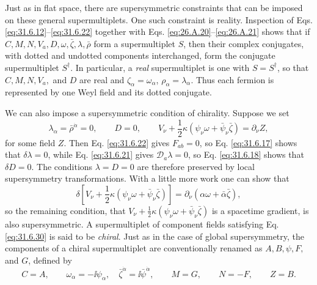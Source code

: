 Just as in flat space, there are supersymmetric constraints that can be
imposed on these general supermultiplets. One such constraint is
reality. Inspection of Eqs. \eqref{eq:31.6.12}--\eqref{eq:31.6.22}
together with Eqs. \eqref{eq:26.A.20}--\eqref{eq:26.A.21} shows that if
\(C,M,N,V_a,D,\omega,\bar\zeta,\lambda,\bar\rho\) form a supermultiplet
\(S\), then their complex conjugates, with dotted and undotted components
interchanged, form the conjugate supermultiplet \(S^\dagger\). In
particular, a \emph{real} supermultiplet is one with \(S=S^\dagger\), so
that \(C,M,N,V_a,\) and \(D\) are real and
\(\zeta_\alpha=\omega_\alpha\), \(\rho_\alpha=\lambda_\alpha\). Thus each
fermion is represented by one Weyl field and its dotted conjugate.

We can also impose a supersymmetric condition of chirality. Suppose we
set
\begin{equation}
  \lambda_\alpha=\bar\rho^{\dot\alpha}=0,\qquad D=0,\qquad
  V_\nu+\frac{1}{2}\kappa
   (\psi_\nu\omega+\bar\psi_\nu\bar\zeta)=\partial_\nu Z,
  \tag{31.6.30}\label{eq:31.6.30}
\end{equation}
for some field \(Z\). Then Eq. \eqref{eq:31.6.22} gives \(F_{ab}=0\), so
Eq. \eqref{eq:31.6.17} shows that \(\delta\lambda=0\), while
Eq. \eqref{eq:31.6.21} gives \(\mathcal D_a\lambda=0\), so
Eq. \eqref{eq:31.6.18} shows that \(\delta D=0\). The conditions
\(\lambda=D=0\) are therefore preserved by local supersymmetry
transformations. With a little more work one can show that
\begin{equation}
  \delta\left[
    V_\nu+\frac{1}{2}\kappa
      (\psi_\nu\omega+\bar\psi_\nu\bar\zeta)\right]
  =\partial_\nu(\alpha\omega+\bar\alpha\bar\zeta),
  \tag{31.6.31}\label{eq:31.6.31}
\end{equation}
so the remaining condition, that
\(V_\nu+\frac{1}{2}\kappa
(\psi_\nu\omega+\bar\psi_\nu\bar\zeta)\) is a spacetime gradient,
is also supersymmetric. A supermultiplet of component fields satisfying
Eq. \eqref{eq:31.6.30} is said to be \emph{chiral}. Just as in the case
of global supersymmetry, the components of a chiral supermultiplet are
conventionally renamed as \(A,B,\psi,F,\) and \(G\), defined by
\begin{equation}
  C=A,\qquad
  \omega_\alpha=-\ii\psi_\alpha,\quad
  \bar\zeta^{\dot\alpha}=\ii\bar\psi^{\dot\alpha},\qquad
  M=G,\qquad
  N=-F,\qquad
  Z=B.
  \tag{31.6.32}\label{eq:31.6.32}
\end{equation}

